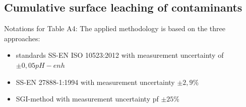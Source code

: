 \documentclass[algorithms,article,submit,pdftex,moreauthors]{Definitions/mdpi}
\begin{document}
\subsection[\appendixname~\thesubsection]{Cumulative surface leaching of contaminants}

Notations for Table A4:  The applied methodology is based on the three approaches: 

\begin{itemize}
    \item standards SS-EN ISO 10523:2012 with measurement uncertainty of $\pm 0,05 pH-enh$
    \item SS-EN 27888-1:1994 with measurement uncertainty $\pm2,9\%$ 
    \item SGI-method with measurement uncertainty pf $\pm 25\%$
\end{itemize}
\end{document}
